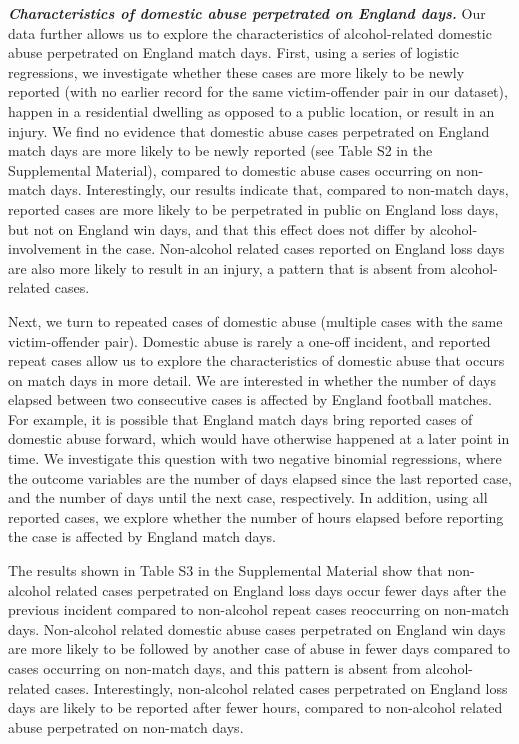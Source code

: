 \documentclass[12pt, a4paper]{article}
\begin{document}
\textbf{\textit{Characteristics of domestic abuse perpetrated on England days.}} Our data further allows us to explore the characteristics of alcohol-related domestic abuse perpetrated on England match days. First, using a series of logistic regressions, we investigate whether these cases are more likely to be newly reported (with no earlier record for the same victim-offender pair in our dataset), happen in a residential dwelling as opposed to a public location, or result in an injury. We find no evidence that domestic abuse cases perpetrated on England match days are more likely to be newly reported (see Table S2 in the Supplemental Material), compared to domestic abuse cases occurring on non-match days. Interestingly, our results indicate that, compared to non-match days, reported cases are more likely to be perpetrated in public on England loss days, but not on England win days, and that this effect does not differ by alcohol-involvement in the case. Non-alcohol related cases reported on England loss days are also more likely to result in an injury, a pattern that is absent from alcohol-related cases.

Next, we turn to repeated cases of domestic abuse (multiple cases with the same victim-offender pair). Domestic abuse is rarely a one-off incident, and reported repeat cases allow us to explore the characteristics of domestic abuse that occurs on match days in more detail. We are interested in whether the number of days elapsed between two consecutive cases is affected by England football matches. For example, it is possible that England match days bring reported cases of domestic abuse forward, which would have otherwise happened at a later point in time. We investigate this question with two negative binomial regressions, where the outcome variables are the number of days elapsed since the last reported case, and the number of days until the next case, respectively. In addition, using all reported cases, we explore whether the number of hours elapsed before reporting the case is affected by England match days.


The results shown in Table S3 in the Supplemental Material show that non-alcohol related cases perpetrated on England loss days occur fewer days after the previous incident compared to non-alcohol repeat cases reoccurring on non-match days. Non-alcohol related domestic abuse cases perpetrated on England win days are more likely to be followed by another case of abuse in fewer days compared to cases occurring on non-match days, and this pattern is absent from alcohol-related cases. Interestingly, non-alcohol related cases perpetrated on England loss days are likely to be reported after fewer hours, compared to non-alcohol related abuse perpetrated on non-match days. 
\end{document}
